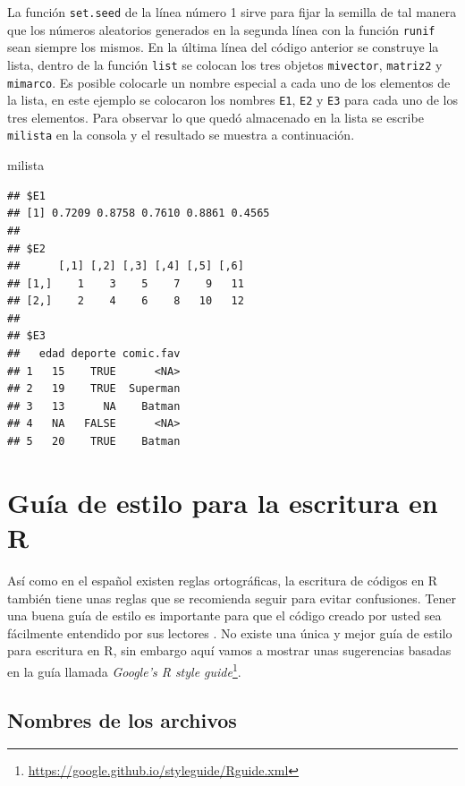 \documentclass[10pt,]{krantz}
\makeatletter
\newenvironment{Shaded}{\begin{snugshade}}{\end{snugshade}}
\newcommand{\NormalTok}[1]{{#1}}
\let\proglang=\textsf
\renewcommand{\href}[2]{#2\footnote{\url{#1}}}
\newenvironment{kframe}{%
\medskip{}
\setlength{\fboxsep}{.8em}
 \def\at@end@of@kframe{}%
 \ifinner\ifhmode%
  \def\at@end@of@kframe{\end{minipage}}%
  \begin{minipage}{\columnwidth}%
 \fi\fi%
 \def\FrameCommand##1{\hskip\@totalleftmargin \hskip-\fboxsep
 \colorbox{shadecolor}{##1}\hskip-\fboxsep
     \hskip-\linewidth \hskip-\@totalleftmargin \hskip\columnwidth}%
 \MakeFramed {\advance\hsize-\width
   \@totalleftmargin\z@ \linewidth\hsize
   \@setminipage}}%
 {\par\unskip\endMakeFramed%
 \at@end@of@kframe}
\renewenvironment{Shaded}{\begin{kframe}}{\end{kframe}}
\makeatother
\begin{document}
La función \texttt{set.seed} de la línea número 1 sirve para fijar la
semilla de tal manera que los números aleatorios generados en la segunda
línea con la función \texttt{runif} sean siempre los mismos. En la
última línea del código anterior se construye la lista, dentro de la
función \texttt{list} se colocan los tres objetos \texttt{mivector},
\texttt{matriz2} y \texttt{mimarco}. Es posible colocarle un nombre
especial a cada uno de los elementos de la lista, en este ejemplo se
colocaron los nombres \texttt{E1}, \texttt{E2} y \texttt{E3} para cada
uno de los tres elementos. Para observar lo que quedó almacenado en la
lista se escribe \texttt{milista} en la consola y el resultado se
muestra a continuación.

\begin{Shaded}
\begin{Highlighting}[]
\NormalTok{milista}
\end{Highlighting}
\end{Shaded}

\begin{verbatim}
## $E1
## [1] 0.7209 0.8758 0.7610 0.8861 0.4565
## 
## $E2
##      [,1] [,2] [,3] [,4] [,5] [,6]
## [1,]    1    3    5    7    9   11
## [2,]    2    4    6    8   10   12
## 
## $E3
##   edad deporte comic.fav
## 1   15    TRUE      <NA>
## 2   19    TRUE  Superman
## 3   13      NA    Batman
## 4   NA   FALSE      <NA>
## 5   20    TRUE    Batman
\end{verbatim}

\section{Guía de estilo para la escritura en R} \label{sec:estilo}

Así como en el español existen reglas ortográficas, la escritura de
códigos en \proglang{R} también tiene unas reglas que se recomienda
seguir para evitar confusiones. Tener una buena guía de estilo
 es importante para que el código creado por usted
sea fácilmente entendido por sus lectores \citet{rpackages}. No existe
una única y mejor guía de estilo para escritura en \proglang{R}, sin
embargo aquí vamos a mostrar unas sugerencias basadas en la guía llamada
\href{https://google.github.io/styleguide/Rguide.xml}{\textit{Google's R style guide}}.

\subsection{Nombres de los archivos}
\end{document}
